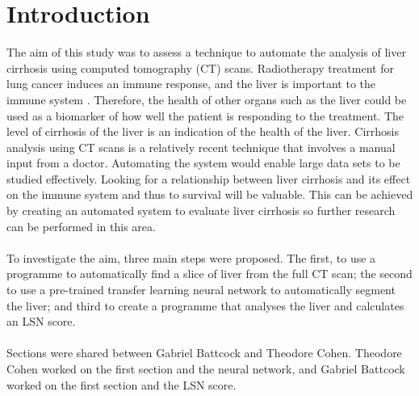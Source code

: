 \documentclass[12pt]{article}
\begin{document}
\section{Introduction} 
The aim of this study was to assess a technique to automate the analysis of liver cirrhosis using computed tomography (CT) scans.  %
Radiotherapy treatment for lung cancer induces an immune response, and the liver is important to the immune system  \cite{Wang:2018aa} \cite{Kubes:2018aa}. Therefore, the health of other organs such as the liver could be used as a biomarker of how well the patient is responding to the treatment. The level of cirrhosis of the liver is an indication of the health of the liver. Cirrhosis analysis using CT scans is a relatively recent technique that involves a manual input from a doctor. Automating the system would enable large data sets to be studied effectively. Looking for a relationship between liver cirrhosis and its effect on the immune system and thus to survival will be valuable.  This can be achieved by creating an automated system to evaluate liver cirrhosis so further research can be performed in this area.  
\\ \\
To investigate the aim, three main steps were proposed. The first, to use a programme to automatically find a slice of liver from the full CT scan; the second to use a pre-trained transfer learning neural network to automatically segment the liver; and third to create a programme that analyses the liver and calculates an LSN score.
\\ \\
Sections were shared between Gabriel Battcock and Theodore Cohen. Theodore Cohen worked on the first section and the neural network, and Gabriel Battcock worked on the first section and the LSN score.
\end{document}
